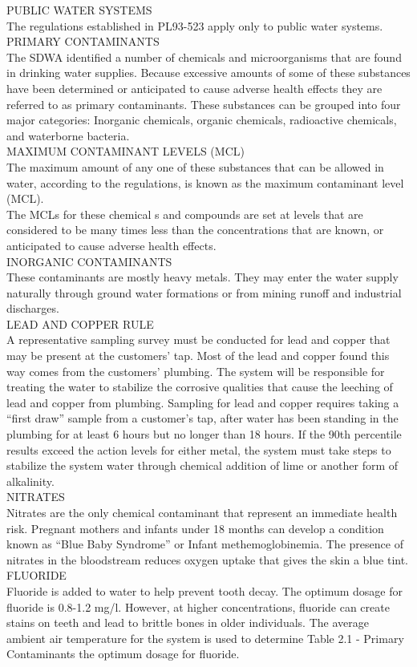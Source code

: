 \documentclass{article}
\begin{document}
PUBLIC WATER SYSTEMS\\
The regulations established in PL93-523 apply only to public water systems.
PRIMARY CONTAMINANTS\\
The SDWA identified a number of chemicals and microorganisms that are found in drinking water supplies.  Because excessive amounts of some of these substances have been determined or anticipated to cause adverse health effects they are referred to as primary contaminants. These substances can be grouped into four major categories:
Inorganic chemicals, organic chemicals, radioactive chemicals, and waterborne bacteria.\\ 
MAXIMUM CONTAMINANT LEVELS (MCL)\\
The maximum amount of any one of these substances that can be allowed in water, according to the regulations, is known as the maximum contaminant level (MCL). \\
The MCLs for these chemical s and compounds are set at levels that are considered to be many times less than the concentrations that are known, or anticipated to cause adverse health effects.\\
INORGANIC CONTAMINANTS\\
These contaminants are mostly heavy metals. They may enter the water supply naturally through ground water formations or from mining runoff and industrial discharges.\\
LEAD AND COPPER RULE\\
A representative sampling survey must be conducted for lead and copper that may be present at the customers’ tap. Most of the lead and copper found this way comes from the customers’ plumbing. The system will be responsible for treating the water to stabilize the corrosive qualities that cause the leeching of lead and copper from plumbing. Sampling for lead and copper requires taking a “first draw” sample from a customer’s tap, after water has been standing in the plumbing for at least 6 hours but no longer than 18 hours. If the 90th percentile results exceed the action levels for either metal, the system must take steps to stabilize the system water through chemical addition of lime or another form of alkalinity.\\
NITRATES\\
Nitrates are the only chemical contaminant that represent an immediate health risk. Pregnant mothers and infants under 18 months can develop a condition known as “Blue Baby Syndrome” or Infant methemoglobinemia. The presence of nitrates in the bloodstream reduces oxygen uptake that gives the skin a blue tint.
FLUORIDE\\
Fluoride is added to water to help prevent tooth decay. The optimum dosage for fluoride is 0.8-1.2 mg/l. However, at higher concentrations, fluoride can create stains on teeth and lead to brittle bones in older individuals. The average ambient air temperature for the system is used to determine Table 2.1 - Primary Contaminants the optimum dosage for fluoride.\\
\end{document}
